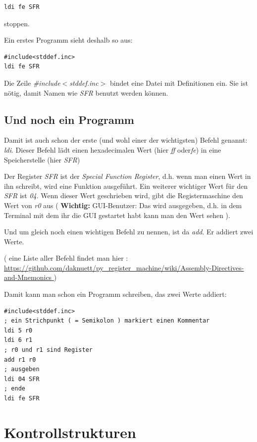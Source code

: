 \documentclass[a4paper,12pt,oneside]{scrreprt}
\begin{document}
\begin{lstlisting}[frame=single]
ldi fe SFR
\end{lstlisting}

stoppen.

Ein erstes Programm sieht deshalb so aus:

\begin{lstlisting}[frame=single]
#include<stddef.inc>
ldi fe SFR
\end{lstlisting}

Die Zeile \textit{\#include$<$stddef.inc$>$} bindet eine Datei mit Definitionen ein. Sie ist nötig, damit Namen wie \textit{SFR} benutzt werden können.


\section{Und noch ein Programm}

Damit ist auch schon der erste (und wohl einer der wichtigsten) Befehl genannt: \textit{ldi}.  
Dieser Befehl lädt einen hexadecimalen Wert (hier \textit{ff} oder\textit{fe}) in eine Speicherstelle (hier \textit{SFR})

Der Register \textit{SFR} ist der \textit{Special Function Register}, d.h. wenn man einen Wert in ihn schreibt, wird eine Funktion ausgeführt. Ein weiterer wichtiger Wert für den \textit{SFR} ist \textit{04}. Wenn dieser Wert geschrieben wird, gibt die Registermaschine den Wert von \textit{r0} aus ( \textbf{Wichtig:} GUI-Benutzer: Das wird ausgegeben, d.h. in dem Terminal mit dem ihr die GUI gestartet habt kann man den Wert sehen ).

Und um gleich noch einen wichtigen Befehl zu nennen, ist da \textit{add}. Er addiert zwei Werte.

( eine Liste aller Befehl findet man hier : \url{https://github.com/daknuett/py_register_machine/wiki/Assembly-Directives-and-Mnemonics } )

Damit kann man schon ein Programm schreiben, das zwei Werte addiert:

\begin{lstlisting}[frame=single]
#include<stddef.inc>
; ein Strichpunkt ( = Semikolon ) markiert einen Kommentar
ldi 5 r0
ldi 6 r1
; r0 und r1 sind Register
add r1 r0
; ausgeben
ldi 04 SFR
; ende
ldi fe SFR
\end{lstlisting}

\chapter{Kontrollstrukturen}
\end{document}
